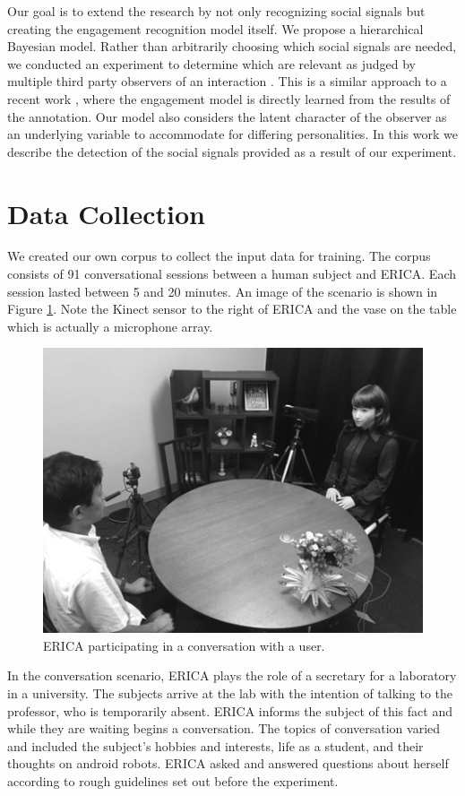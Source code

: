 \documentclass[letterpaper]{article} %
\begin{document}
Our goal is to extend the research by not only recognizing social signals but creating the engagement recognition model itself. We propose a hierarchical Bayesian model. Rather than arbitrarily choosing which social signals are needed, we conducted an experiment to determine which are relevant as judged by multiple third party observers of an interaction \cite{Inoue2016}. This is a similar approach to a recent work \cite{Oertel2015}, where the engagement model is directly learned from the results of the annotation. Our model also considers the latent character of the observer as an underlying variable to accommodate for differing personalities. In this work we describe the detection of the social signals provided as a result of our experiment.

\section{Data Collection}\label{data}
We created our own corpus to collect the input data for training. The corpus consists of 91 conversational sessions between a human subject and ERICA. Each session lasted between 5 and 20 minutes. An image of the scenario is shown in Figure \ref{ericaconvo}. Note the Kinect sensor to the right of ERICA and the vase on the table which is actually a microphone array.

\begin{figure}
	\centering
		\includegraphics{ericaconvo.jpg}
	\caption{ERICA participating in a conversation with a user.}
		\label{ericaconvo}
\end{figure}

In the conversation scenario, ERICA plays the role of a secretary for a laboratory in a university. The subjects arrive at the lab with the intention of talking to the professor, who is temporarily absent. ERICA informs the subject of this fact and while they are waiting begins a conversation. The topics of conversation varied and included the subject's hobbies and interests, life as a student, and their thoughts on android robots. ERICA asked and answered questions about herself according to rough guidelines set out before the experiment.
\end{document}

